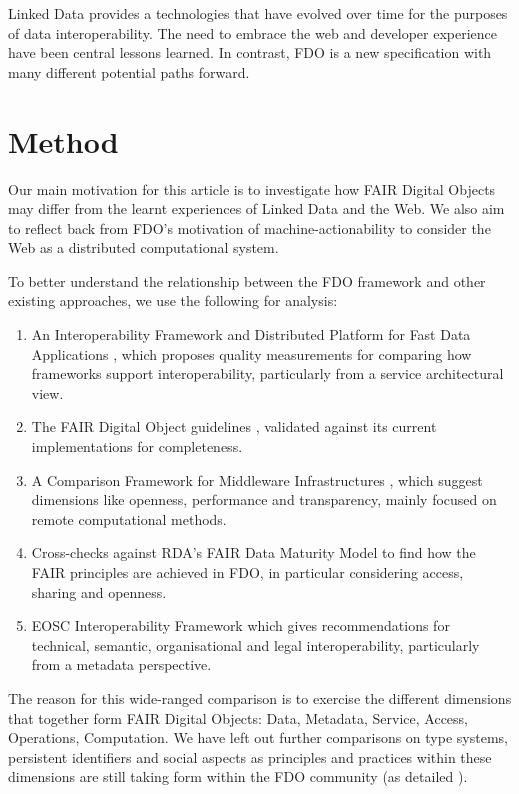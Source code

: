 \documentclass[fleqn,10pt,NOlineno]{wlpeerjlua}
\providecommand{\tightlist}{%
  \setlength{\itemsep}{0pt}\setlength{\parskip}{0pt}}
\begin{document}
Linked Data provides a technologies that have evolved over time for the purposes of data interoperability. The need to embrace the web and developer experience have been central lessons learned.  In contrast, FDO is a new specification with many different potential paths forward.



\section*{Method}

Our main motivation for this article is to investigate how FAIR Digital Objects may differ from the learnt experiences of Linked Data and the Web. We also aim to reflect back from FDO's motivation of machine-actionability to consider the Web as a distributed computational system.

To better understand the relationship between the FDO framework and other existing approaches, we use the following for analysis:

\begin{enumerate}
\tightlist
\item
  An Interoperability Framework and Distributed Platform for Fast Data Applications \autocite{delgadoInteroperabilityFrameworkDistributed2016a}, which proposes quality measurements for comparing how frameworks support interoperability, particularly from a service architectural view.
\item
  The FAIR Digital Object guidelines \autocite{boninoFAIRDigitalObject}, validated against its current implementations for completeness.
\item
  A Comparison Framework for Middleware Infrastructures \autocite{zarrasComparisonFrameworkMiddleware2004a}, which suggest dimensions like openness, performance and transparency, mainly focused on remote computational methods.
\item
  Cross-checks against RDA's FAIR Data Maturity Model \autocite{bahimFAIRDataMaturity2020a} to find how the FAIR principles are achieved in FDO, in particular considering access, sharing and openness.
\item
  EOSC Interoperability Framework \autocite{corchoEOSCInteroperabilityFramework2021b} which gives recommendations for technical, semantic, organisational and legal interoperability, particularly from a metadata perspective.
\end{enumerate}

The reason for this wide-ranged comparison is to exercise the different dimensions that together form FAIR Digital Objects: Data, Metadata, Service, Access, Operations, Computation.
We have left out further comparisons on type systems, persistent identifiers and social aspects as principles and practices within these dimensions are still taking form within the FDO community (as detailed  ).
\end{document}
